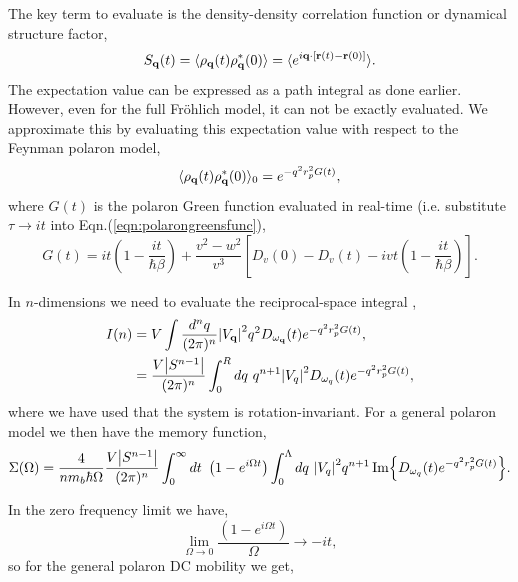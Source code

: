 The key term to evaluate is the density-density correlation function or dynamical structure factor,
\begin{equation}
    S_{\vb{q}}(t) = \langle \rho_{\vb{q}}(t) \rho^*_{\vb{q}}(0) \rangle = \langle e^{i \vb{q} \cdot \left[ \vb{r}(t) - \vb{r}(0) \right]} \rangle.
\end{equation}
The expectation value can be expressed as a path integral as done earlier. However, even for the full Fr\"ohlich model, it can not be exactly evaluated. We approximate this by evaluating this expectation value with respect to the Feynman polaron model,
\begin{equation}
    \langle \rho_{\vb{q}}(t) \rho^*_{\vb{q}}(0) \rangle_0 = e^{-q^2 r_p^2 G(t)},
\end{equation}
where $G(t)$ is the polaron Green function evaluated in real-time (i.e. substitute $\tau \to it$ into Eqn.(\ref{eqn:polarongreensfunc}),
\begin{equation}
    G(t) = i t \left(1 - \frac{i t}{\hbar \beta} \right) + \frac{v^2 - w^2}{v^3} \left[ D_v(0) - D_v(t)  - i v t \left(1 - \frac{i t}{\hbar \beta} \right) \right].
\end{equation}

In $n$-dimensions we need to evaluate the reciprocal-space integral ,
\begin{equation}
    \begin{aligned}
        I(n) &= V \int \frac{d^n q}{(2\pi)^n} \abs{V_{\vb{q}}}^2 q^2 D_{\omega_{\vb{q}}}(t) e^{-q^2 r_p^2 G(t)}, \\
        &= \frac{V \abs{S^{n-1}}}{(2\pi)^n} \int_0^R dq\ q^{n+1} \abs{V_{q}}^2 D_{\omega_{q}}(t) e^{-q^2 r_p^2 G(t)} ,
    \end{aligned}
\end{equation}
where we have used that the system is rotation-invariant. For a general polaron model we then have the memory function,
\begin{equation}
    \Sigma(\Omega) = \frac{4}{n m_b\hbar\Omega} \frac{V \abs{S^{n-1}}}{(2\pi)^n} \int_0^\infty dt\ \left(1 - e^{i \Omega t}\right) \int_0^\Lambda dq\ \abs{V_{q}}^2 q^{n+1} \Im{D_{\omega_q}(t) e^{-q^2 r_p^2 G(t)}}.
\end{equation}

In the zero frequency limit we have,
\begin{equation}
    \lim_{\Omega \to 0} \frac{\left(1 - e^{i \Omega t}\right)}{\Omega} \to -i t,
\end{equation}
so for the general polaron DC mobility we get,

